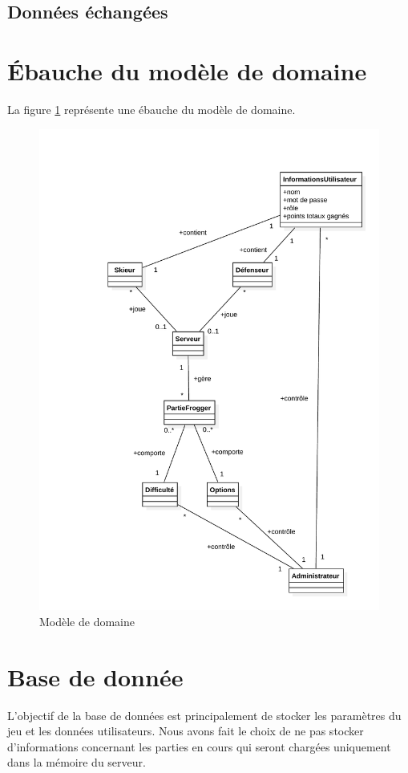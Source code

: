 \documentclass[a4paper,11pt]{article}
\begin{document}
		\subsection{Données échangées}

	\section{Ébauche du modèle de domaine}
	La figure \ref{model_domain} représente une ébauche du modèle de domaine.

	\begin{figure}[!ht]
		\centering
		\includegraphics[scale=0.6]{../Schemas/model_domain.pdf}
		\caption{Modèle de domaine}
		\label{model_domain}
	\end{figure}

	\section{Base de donnée}
	L'objectif de la base de données est principalement de stocker les paramètres du jeu et les données utilisateurs. Nous avons fait le choix de ne pas stocker d'informations concernant les parties en cours qui seront chargées uniquement dans la mémoire du serveur. \par
\end{document}
